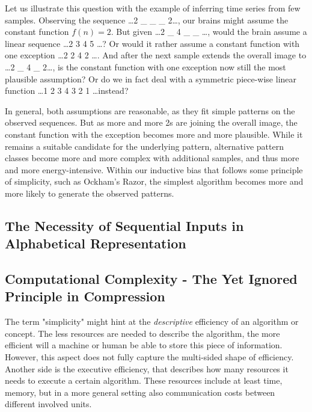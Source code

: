 Let us illustrate this question with the example of inferring time series from few samples.
Observing the sequence \dots 2 \_ \_ \_ 2\dots, our brains might assume the constant function $f(n)=2$.
But given \dots 2 \_ 4 \_ \_ \dots, would the brain assume a linear sequence \dots 2 3 4 5 \dots? Or would it rather assume a constant function with one exception \dots 2 2 4 2 \dots.
And after the next sample extends the overall image to \dots 2 \_ 4 \_ 2\dots, is the constant function with one exception now still the most plausible assumption?
Or do we in fact deal with a symmetric piece-wise linear function \dots 1 2 3 4 3 2 1 \dots instead?

In general, both assumptions are reasonable, as they fit simple patterns on the observed sequences.
But as more and more 2s are joining the overall image, the constant function with the exception becomes more and more plausible. While it remains a suitable candidate for the underlying pattern, alternative pattern classes become more and more complex with additional samples, and thus more and more energy-intensive. Within our inductive bias that follows some principle of simplicity, such as Ockham's Razor, the simplest algorithm becomes more and more likely to generate the observed patterns. 

\subsection{The Necessity of Sequential Inputs in Alphabetical Representation}

\subsection{Computational Complexity - The Yet Ignored Principle in Compression}
The term "simplicity" might hint at the \textit{descriptive} efficiency of an algorithm or concept. The less resources are needed to describe the algorithm, the more efficient will a machine or human be able to store this piece of information. 
However, this aspect does not fully capture the multi-sided shape of efficiency. Another side is the executive efficiency, that describes how many resources it needs to execute a certain algorithm. These resources include at least time, memory, but in a more general setting also communication costs between different involved units.

